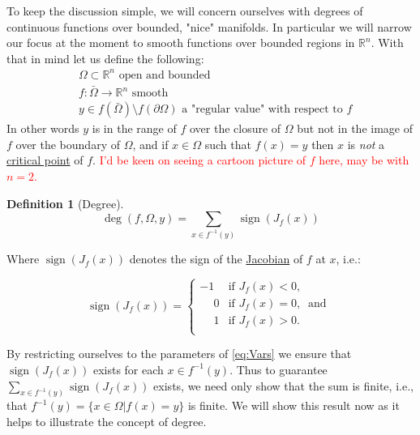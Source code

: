 \documentclass[11pt]{article}
\theoremstyle{plain}
\theoremstyle{definition}
\newtheorem{cdef}{Definition}[section]
\theoremstyle{remark}
\newcommand{\delete}[1]{\textcolor{red}{#1}}
\newcommand{\p}{\phantom{-}}
\begin{document}
\medskip
To keep the discussion simple, %
we will concern ourselves with degrees of continuous functions over bounded, "nice" manifolds. In particular we will narrow our focus at the moment to smooth functions over bounded regions in $\mathbb{R}^n$. With that in mind let us define the following: 
\begin{subequations}\label{eq:Vars}
\begin{align}
& \Omega\subset\mathbb{R}^n \text{ open and bounded }\\
& f:\bar{\Omega}\rightarrow \mathbb{R}^n \text{ smooth } \\
& y\in f\left(\bar{\Omega}\right)\setminus f\left(\partial\Omega\right) \text{ a "regular value" with respect to $f$}
\end{align}
\end{subequations}
In other words $y$ is in the range of $f$ over the closure of $\Omega$ but not in the image of $f$ over the boundary of $\Omega$, and if $x\in\Omega$ such that $f(x)=y$ then $x$ is \emph{not} a \href{https://en.wikipedia.org/wiki/Critical_point_(mathematics)}{critical point} of $f$.  \delete{I'd be keen on seeing a cartoon picture of $f$ here, may be with $n=2$.} \\


\begin{cdef}[Degree] \ \\
$$\operatorname{deg}\left(f,\Omega,y\right)=\sum\limits_{x\in f^{-1}(y)}\operatorname{sign}\left(J_f(x)\right)$$
\end{cdef}

Where $\operatorname{sign}\left(J_f(x)\right)$ denotes the sign of the \href{https://en.wikipedia.org/wiki/Jacobian_matrix_and_determinant}{Jacobian} of $f$ at $x$, i.e.:

\[\operatorname{sign}\left(J_f(x)\right)=   \left\{
\begin{array}{ll}
      -1   & \mbox{if } J_f(x)< 0, \\
      \p 0 & \mbox{if } J_f(x)= 0,~\mbox{ and } \\
      \p 1 & \mbox{if } J_f(x)> 0. \\
\end{array} 
\right. \]

By restricting ourselves to the parameters of \eqref{eq:Vars} we ensure that $\operatorname{sign}\left(J_f(x)\right)$ exists for each $x\in f^{-1}(y)$.
Thus to guarantee $\sum\limits_{x\in f^{-1}(y)}\operatorname{sign}\left(J_f(x)\right)$ exists, we need only show that the sum is finite, i.e., that  $f^{-1}(y)=\{x\in\Omega|f(x)=y\}$ is finite.
We will show this result now as it helps to illustrate the concept of degree. 
\end{document}

